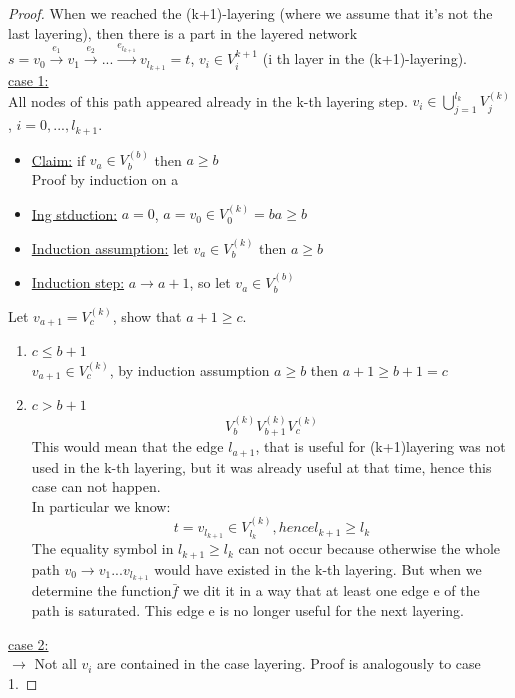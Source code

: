 \begin{proof}
When we reached the (k+1)-layering (where we assume that it's not the last layering), then there is a part in the layered network $s = v_0 \xrightarrow{e_1} v_1 \xrightarrow{e_2} ... \xrightarrow{e_{l_{k+1}}} v_{l_{k+1}} = t$, $v_i \in V_i^{k+1}$ (i th layer in the (k+1)-layering). \\

\underline{case 1:} \\
All nodes of this path appeared already in the k-th layering step. $v_i \in \bigcup_{j=1}^{l_k} V_j^{(k)}$, $i = 0, ..., l_{k+1}$.
\begin{itemize}
\item \underline{Claim:} if $v_a \in V_b^{(b)}$ then $a \ge b$ \\ 
Proof by induction on a 
\item \underline{Ing stduction:} $a = 0$, $a = v_0 \in V_0^{(k)} = b a \ge b$
\item \underline{Induction assumption:} let $v_a \in V_b^{(k)}$ then $a \ge b$
\item \underline{Induction step:} $a \rightarrow a +1$, so let $v_a \in V_b^{(b)}$ 
\end{itemize} 

Let $v_{a+1} = V_c^{(k)}$, show that $a+1 \ge c$.

\begin{enumerate}
\item $c \le b +1$ \\
$v_{a+1} \in V_c^{(k)}$, by induction assumption $a \ge b$ then $a+1 \ge b +1 = c$
\item $c > b +1 $ \\
\[V_b^{(k)}  V_{b+1}^{(k)} V_c^{(k)}\]
This would mean that the edge $l_{a+1}$, that is useful for (k+1)layering was not used in the k-th layering, but it was already useful at that time, hence this case can not happen. \\
In particular we know:
\[t = v_{l_{k+1}} \in V_{l_k}^{(k)}, hence l_{k+1} \ge l_k\]
The equality symbol in $l_{k+1} \ge l_k$ can not occur because otherwise the whole path $v_0 \rightarrow v_1 ... v_{l_{k+1}}$ would have existed in the k-th layering. But when we determine the function$\bar{f}$ we dit it in a way that at least one edge e of the path is saturated. This edge e is no longer useful for the next layering. \\
\end{enumerate}
\underline{case 2:} \\
$\rightarrow$ Not all $v_i$ are contained in the case layering. Proof is analogously to case 1.
\end{proof}

